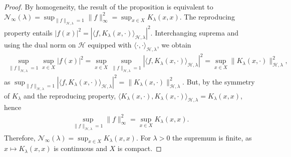 \documentclass[10pt,a4paper]{amsart}
\begin{document}
\begin{proof}

By homogeneity, the result of the proposition is equivalent to $\mathcal{N}_{\infty}(\lambda) = \sup_{\|f\|_{\mathcal{H},\lambda} = 1} \|f\|_{\infty}^2 = \sup_{x \in X} K_{\lambda}(x,x)$. The reproducing property entails $|f(x)|^2 = |\langle f, K_{\lambda}(x,\cdot)\rangle_{\mathcal{H},\lambda}|^2$.  Interchanging suprema and using the dual norm on $\mathcal{H}$ equipped with $ \langle \cdot, \cdot \rangle_{\mathcal{H},\lambda}$, we obtain
\begin{align*}
\sup_{\|f\|_{\mathcal{H},\lambda} = 1} \sup_{x \in X} |f(x)|^2 =  \sup_{x \in X} \sup_{\|f\|_{\mathcal{H},\lambda} = 1} |\langle f, K_{\lambda}(x,\cdot) \rangle_{\mathcal{H},\lambda}|^2 =  \sup_{x \in X} \|K_{\lambda}(x,\cdot)\|_{\mathcal{H}, \lambda}^2,
\end{align*}
as $\sup_{\|f\|_{\mathcal{H},\lambda} = 1} |\langle f, K_{\lambda}(x,\cdot) \rangle_{\mathcal{H},\lambda}|^2 = \| K_{\lambda}(x,\cdot)\|_{\mathcal{H},\lambda}^2$. But, by the symmetry of $K_{\lambda}$ and the reproducing property, $\langle K_{\lambda}(x,\cdot), K_{\lambda}(x,\cdot) \rangle_{\mathcal{H},\lambda} = K_{\lambda}(x,x)$, hence
\begin{align*}
\sup_{\|f\|_{\mathcal{H},\lambda} = 1} \|f\|_{\infty}^2 = \sup_{x \in X} K_{\lambda}(x,x).
\end{align*}
Therefore, $\mathcal{N}_{\infty}(\lambda) = \sup_{x \in X} K_{\lambda}(x,x)$. For $\lambda>0$ the supremum is finite, as $x \mapsto K_{\lambda}(x,x)$ is continuous and $X$ is compact. 
\end{proof}
\end{document}
